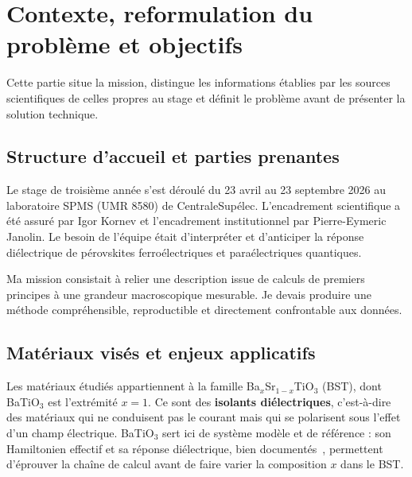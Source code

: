 \documentclass{rapportCS}
\begin{document}
\clearpage
\renewcommand{\contentsname}{Sommaire}
\tableofcontents

\clearpage

\section{Contexte, reformulation du problème et objectifs}
\label{sec:mission_context}

Cette partie situe la mission, distingue les informations établies par les
sources scientifiques de celles propres au stage et définit le problème avant
de présenter la solution technique.

\subsection{Structure d'accueil et parties prenantes}

Le stage de troisième année s'est déroulé du 23 avril au 23 septembre 2026 au
laboratoire SPMS (UMR 8580) de CentraleSupélec. L'encadrement scientifique a été
assuré par Igor Kornev et l'encadrement institutionnel par Pierre-Eymeric
Janolin. Le besoin de l'équipe était d'interpréter et d'anticiper la réponse
diélectrique de pérovskites ferroélectriques et paraélectriques quantiques.

Ma mission consistait à relier une description issue de calculs de premiers
principes à une grandeur macroscopique mesurable. Je devais produire une
méthode compréhensible, reproductible et directement confrontable aux données.

\subsection{Matériaux visés et enjeux applicatifs}

Les matériaux étudiés appartiennent à la famille
Ba$_x$Sr$_{1-x}$TiO$_3$ (BST), dont BaTiO$_3$ est l'extrémité $x=1$. Ce sont
des \textbf{isolants diélectriques}, c'est-à-dire des matériaux qui ne conduisent pas le courant
mais qui se polarisent sous l'effet d'un champ électrique. BaTiO$_3$ sert ici
de système modèle et de
référence : son Hamiltonien effectif et sa réponse diélectrique, bien
documentés~\cite{Zhong1995,Nishimatsu2010,Mayer2022}, permettent d'éprouver la
chaîne de calcul avant de faire varier la composition $x$ dans le BST.
\end{document}
